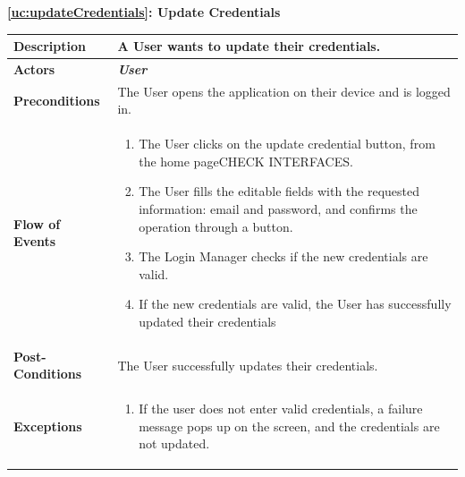\documentclass[a4paper, 10pt, oneside]{article}
\newcommand*{\lorenzo}[1]{\textcolor{BurntOrange}{#1}}
\begin{document}
\begin{center}
{\textbf{\ref{uc:updateCredentials}: Update Credentials}}
\end{center}
\begin{tabularx}{\linewidth}{| l | X |}
	
	\hline
	\textbf{Description} & A User wants to update their credentials.\\
	

	\hline
	\textbf{Actors} & \textbf{\textit{User}}\\
	
	\hline
	\textbf{Preconditions} & The User opens the application on their device and is logged in.\\
	
	\hline
	\textbf{Flow of Events} & \parbox{0.7\textwidth}{	
		\begin{enumerate}
			\item The User clicks on the update credential button, from the home page\lorenzo{CHECK INTERFACES}.
			\item The User fills the editable fields with the requested information: email and password, and confirms the operation through a button.
			\item The \lorenzo{Login Manager} checks if the new credentials are valid. 
			\item If the new credentials are valid, the User has successfully updated their credentials
	\end{enumerate}}\\
	
	\hline
	\textbf{Post-Conditions} & The User successfully updates their credentials.\\
	
	\hline
	\textbf{Exceptions} & \parbox{0.7\textwidth}{ \begin{enumerate}
			\item If the user does not enter valid credentials, a failure message pops up on the screen, and the credentials are not updated.
		\end{enumerate}}\\

	\hline
	
\end{tabularx}
\end{document}
